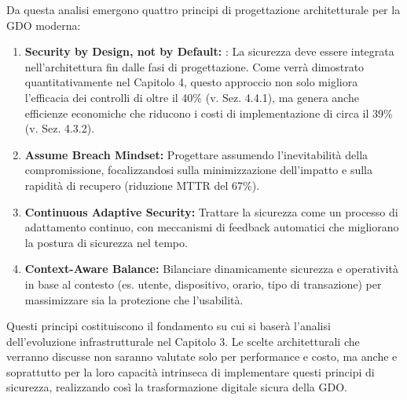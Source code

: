 Da questa analisi emergono quattro principi di progettazione architetturale per la GDO moderna:
\begin{enumerate}
    \item \textbf{Security by Design, not by Default: }: La sicurezza deve essere integrata nell'architettura fin dalle fasi di progettazione. Come verrà dimostrato quantitativamente nel Capitolo 4, questo approccio non solo migliora l'efficacia dei controlli di oltre il 40\% (v. Sez. 4.4.1), ma genera anche efficienze economiche che riducono i costi di implementazione di circa il 39\% (v. Sez. 4.3.2).
 
    \item \textbf{Assume Breach Mindset:} Progettare assumendo l'inevitabilità della compromissione, focalizzandosi sulla minimizzazione dell'impatto e sulla rapidità di recupero (riduzione MTTR del 67\%).
   
    \item \textbf{Continuous Adaptive Security:} Trattare la sicurezza come un processo di adattamento continuo, con meccanismi di feedback automatici che migliorano la postura di sicurezza nel tempo.
 
    \item \textbf{Context-Aware Balance:} Bilanciare dinamicamente sicurezza e operatività in base al contesto (es. utente, dispositivo, orario, tipo di transazione) per massimizzare sia la protezione che l'usabilità.
\end{enumerate}

Questi principi costituiscono il fondamento su cui si baserà l'analisi dell'evoluzione infrastrutturale nel Capitolo 3. Le scelte architetturali che verranno discusse non saranno valutate solo per performance e costo, ma anche e soprattutto per la loro capacità intrinseca di implementare questi principi di sicurezza, realizzando così la trasformazione digitale sicura della GDO.


\clearpage
\printbibliography[
    heading=subbibliography, %
    title={Riferimenti Bibliografici del Capitolo 2}, %
]
\endrefsection













